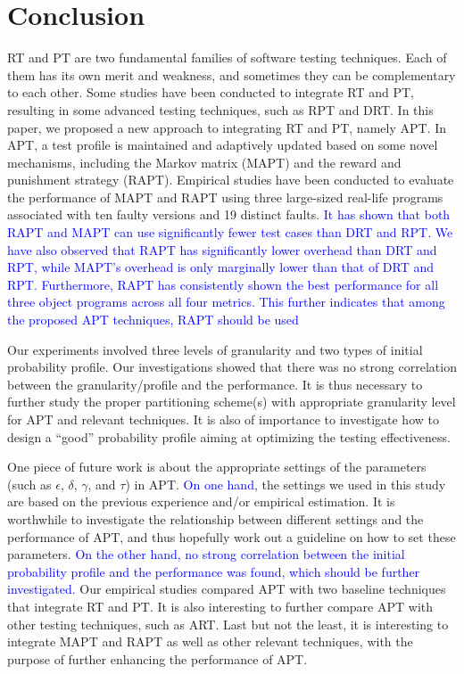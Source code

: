 \documentclass[10pt,journal,compsoc]{IEEEtran}
\begin{document}
\section{Conclusion}
\label{sec:conc}

RT and PT are two fundamental families of software testing techniques. Each of them has its own merit and weakness, and sometimes they can be complementary to each other. Some studies have been conducted to integrate RT and PT, resulting in some advanced testing techniques, such as RPT and DRT. In this paper, we proposed a new approach to integrating RT and PT, namely APT. In APT, a test profile is maintained and adaptively updated based on some novel mechanisms, including the Markov matrix (MAPT) and the reward and punishment strategy (RAPT). Empirical studies have been conducted to evaluate the performance of MAPT and RAPT using three large-sized real-life programs associated with ten faulty versions and 19 distinct faults.
\textcolor{blue}{It has shown that both RAPT and MAPT can use significantly fewer test cases than DRT and RPT. We have also observed that RAPT has significantly lower overhead than DRT and RPT, while MAPT's overhead is only marginally lower than that of DRT and RPT.
Furthermore, RAPT has consistently shown the best performance for all three object programs across all four metrics. This further indicates that among the proposed APT techniques, RAPT should be used}

Our experiments involved three levels of granularity and two types of initial probability profile. Our investigations showed that there was no strong correlation between the granularity/profile and the performance. It is thus necessary to further study the proper partitioning scheme(s) with appropriate granularity level for APT and relevant techniques. It is also of importance to investigate how to design a ``good'' probability profile aiming at optimizing the testing effectiveness.


One piece of future work is about the appropriate settings of the parameters (such as $\epsilon$, $\delta$, $\gamma$, and $\tau$) in APT.
\textcolor{blue}{On one hand}, the settings we used in this study are based on the previous experience and/or empirical estimation. It is worthwhile to investigate the relationship between different settings and the performance of APT, and thus hopefully work out a guideline on how to set these parameters. \textcolor{blue}{On the other hand, no strong correlation between the initial probability profile and the performance was found, which should be further investigated.} Our empirical studies compared APT with two baseline techniques that integrate RT and PT. It is also interesting to further compare APT with other testing techniques, such as ART. Last but not the least, it is interesting to integrate MAPT and RAPT as well as other relevant techniques, with the purpose of further enhancing the performance of APT.
\end{document}
